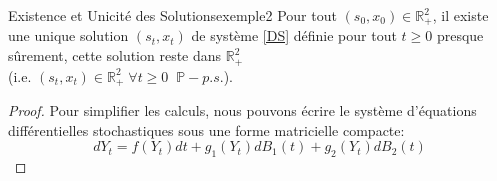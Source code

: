 \documentclass[12pt,a4paper]{report}%
\begin{document}
\begin{théorème}{Existence et Unicité des Solutions}{exemple2}
	Pour tout $(s_0, x_0) \in \mathbb{R}_+^2$, il existe une unique solution $(s_t, x_t)$ de système \eqref{DS} définie pour tout $t \geq 0$ presque sûrement, cette solution reste dans $\mathbb{R}_+^2$ \\ (i.e. $(s_t, x_t) \in \mathbb{R}_+^2 \; \forall t \geq 0 \;\;\mathbb{P}-p.s.$). 
\end{théorème}
\begin{proof}
	Pour simplifier les calculs, nous pouvons écrire le système d'équations différentielles stochastiques sous une forme matricielle compacte:
	\begin{equation}\label{DS1}
		dY_t = f(Y_t)dt + g_1(Y_t)dB_1(t) + g_2(Y_t)dB_2(t)
	\end{equation}
	

\end{proof}
\end{document}
